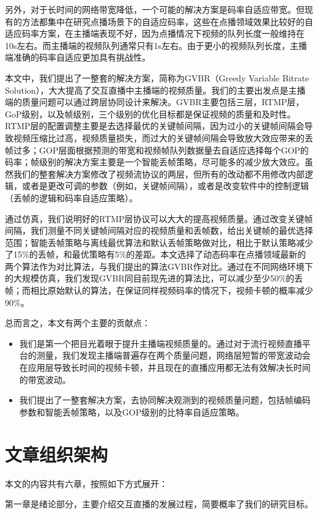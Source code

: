 另外，对于长时间的网络带宽降低，一个可能的解决方案是码率自适应带宽。但现有的方法都集中在研究点播场景下的自适应码率，这些在点播领域效果比较好的自适应码率方案，在主播端表现不好，因为点播情况下视频的队列长度一般维持在10s左右。而主播端的视频队列通常只有1s左右。由于更小的视频队列长度，主播端准确的码率自适应更加具有挑战性。

本文中，我们提出了一整套的解决方案，简称为GVBR（Greedy Variable Bitrate Solution），大大提高了交互直播中主播端的视频质量。我们的主要出发点是主播端的质量问题可以通过跨层协同设计来解决。GVBR主要包括三层，RTMP层，GoP级别，以及帧级别，三个级别的优化目标都是保证视频的质量和及时性。 RTMP层的配置调整主要是去选择最优的关键帧间隔，因为过小的关键帧间隔会导致视频压缩比过高，视频质量损失，而过大的关键帧间隔会导致放大效应带来的丢帧过多；GOP层面根据预测的带宽和视频帧队列数据量去自适应选择每个GOP的码率；帧级别的解决方案主要是一个智能丢帧策略，尽可能多的减少放大效应。虽然我们的整套解决方案修改了视频流协议的两层，但所有的改动都不用修改内部逻辑，或者是更改可调的参数（例如，关键帧间隔），或者是改变软件中的控制逻辑（丢帧的逻辑和码率自适应策略）。

通过仿真，我们说明好的RTMP层协议可以大大的提高视频质量。通过改变关键帧间隔，我们测量不同关键帧间隔对应的视频质量和丢帧数，给出关键帧的最优选择范围；智能丢帧策略与离线最优算法和默认丢帧策略做对比，相比于默认策略减少了15\%的丢帧，和最优策略有5\%的差距。本文选择了动态码率在点播领域最新的两个算法作为对比算法，与我们提出的算法GVBR作对比。通过在不同网络环境下的大规模仿真，我们发现GVBR同目前现先进的算法比，可以减少至少50\%的丢帧；而相比原始默认的算法，在保证同样视频码率的情况下，视频卡顿的概率减少90\%。

总而言之，本文有两个主要的贡献点：
\begin{itemize}
  \item 我们是第一个把目光着眼于提升主播端视频质量的。通过对于流行视频直播平台的测量，我们发现主播端普遍存在两个质量问题，网络层短暂的带宽波动会在应用层导致长时间的视频卡顿，并且现在的直播应用都无法有效解决长时间的带宽波动。
  \item 我们提出了一整套解决方案，去协同解决观测到的视频质量问题，包括帧编码参数和智能丢帧策略，以及GOP级别的比特率自适应策略。
\end{itemize}

\section{文章组织架构}
本文的内容共有六章，按照如下方式展开：

第一章是绪论部分，主要介绍交互直播的发展过程，简要概率了我们的研究目标。


